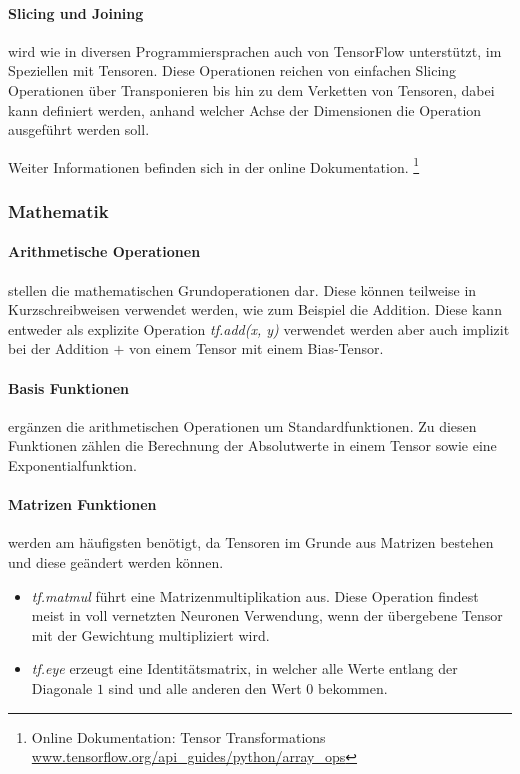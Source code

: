 \paragraph{Slicing und Joining} wird wie in diversen Programmiersprachen auch von TensorFlow unterstützt, im Speziellen mit Tensoren. 
Diese Operationen reichen von einfachen Slicing Operationen über Transponieren bis hin zu dem Verketten von Tensoren, dabei kann definiert werden, anhand welcher Achse der Dimensionen die Operation ausgeführt werden soll.  
\phantom \newline

\noindent
Weiter Informationen befinden sich in der online Dokumentation. \footnote{Online Dokumentation: Tensor Transformations \url{www.tensorflow.org/api_guides/python/array_ops}}

\subsubsection{Mathematik} 

\paragraph{Arithmetische Operationen} stellen die mathematischen Grundoperationen dar. 
Diese können teilweise in Kurzschreibweisen verwendet werden, wie zum Beispiel die Addition. 
Diese kann entweder als explizite Operation \textit{tf.add(x, y)} verwendet werden aber auch implizit bei der Addition $+$ von einem Tensor mit einem Bias-Tensor.

\paragraph{Basis Funktionen} ergänzen die arithmetischen Operationen um Standardfunktionen. 
Zu diesen Funktionen zählen die Berechnung der Absolutwerte in einem Tensor sowie eine Exponentialfunktion. 

\paragraph{Matrizen Funktionen} werden am häufigsten benötigt, da Tensoren im Grunde aus Matrizen bestehen und  diese geändert werden können. 
\begin{itemize}
	\item \textit{tf.matmul} führt eine Matrizenmultiplikation aus. 
	Diese Operation findest meist in voll vernetzten Neuronen Verwendung, wenn der übergebene Tensor mit der Gewichtung multipliziert wird. 
	\item \textit{tf.eye} erzeugt eine Identitätsmatrix, in welcher alle Werte entlang der Diagonale $1$ sind und alle anderen den Wert $0$ bekommen. 
\end{itemize}

